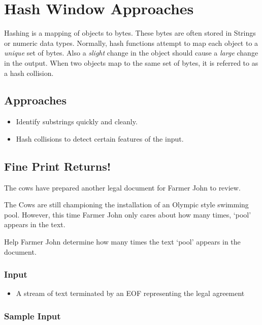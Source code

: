 \section{Hash Window Approaches}
Hashing is a mapping of objects to bytes.
These bytes are often stored in Strings or numeric data types.
Normally, hash functions attempt to map each object to a \textit{unique} set of bytes.
Also a \textit{slight} change in the object should cause a \textit{large} change in the output.
When two objects map to the same set of bytes, it is referred to as a hash collision.

\subsection{Approaches}
\begin{itemize}
	\item Identify substrings quickly and cleanly.
	\item Hash collisions to detect certain features of the input.
\end{itemize}

\subsection{Fine Print Returns!}
The cows have prepared another legal document for Farmer John to review.

The Cows are still championing the installation of an Olympic style swimming pool.
However, this time Farmer John only cares about how many times, `pool' appears in the text.

Help Farmer John determine how many times the text `pool' appears in the document.

\subsubsection{Input}
\begin{itemize}
	\item A stream of text terminated by an EOF representing the legal agreement
\end{itemize}

\subsubsection{Sample Input}


